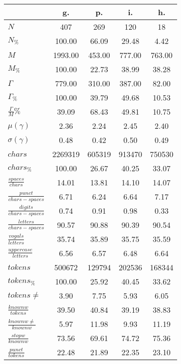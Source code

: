 \begin{table}[h!]
\begin{center}
\begin{tabular}{| l || c | c | c | c |}\hline
 & {\bf g.} & {\bf p.} & {\bf i.} & {\bf h.} \\\hline\hline
$N$ & 407  & 269  & 120  & 18 \\
$N_{\%}$ & 100.00  & 66.09  & 29.48  & 4.42 \\\hline
$M$ & 1993.00  & 453.00  & 777.00  & 763.00 \\
$M_{\%}$ & 100.00  & 22.73  & 38.99  & 38.28 \\\hline
$\Gamma$ & 779.00  & 310.00  & 387.00  & 82.00 \\
$\Gamma_{\%}$ & 100.00  & 39.79  & 49.68  & 10.53 \\\hline
$\frac{\Gamma}{M}\%$ & 39.09  & 68.43  & 49.81  & 10.75 \\
$\mu(\gamma)$ & 2.36  & 2.24  & 2.45  & 2.40 \\
$\sigma(\gamma)$ & 0.48  & 0.42  & 0.50  & 0.49 \\\hline\hline
$chars$ & 2269319  & 605319  & 913470  & 750530 \\
$chars_{\%}$ & 100.00  & 26.67  & 40.25  & 33.07 \\\hline
$\frac{spaces}{chars}$ & 14.01  & 13.81  & 14.10  & 14.07 \\
$\frac{punct}{chars-spaces}$ & 6.71  & 6.24  & 6.64  & 7.17 \\
$\frac{digits}{chars-spaces}$ & 0.74  & 0.91  & 0.98  & 0.33 \\\hline
$\frac{letters}{chars-spaces}$ & 90.57  & 90.88  & 90.39  & 90.54 \\
$\frac{vogals}{letters}$ & 35.74  & 35.89  & 35.75  & 35.59 \\
$\frac{uppercase}{letters}$ & 6.56  & 6.57  & 6.48  & 6.64 \\\hline\hline
$tokens$ & 500672  & 129794  & 202536  & 168344 \\
$tokens_{\%}$ & 100.00  & 25.92  & 40.45  & 33.62 \\
$tokens \neq$ & 3.90  & 7.75  & 5.93  & 6.05 \\\hline
$\frac{knownw}{tokens}$ & 39.50  & 40.84  & 39.19  & 38.83 \\
$\frac{knownw \neq}{knownw}$ & 5.97  & 11.98  & 9.93  & 11.19 \\\hline
$\frac{stopw}{knownw}$ & 73.56  & 69.61  & 74.72  & 75.36 \\
$\frac{punct}{tokens}$ & 22.48  & 21.89  & 22.35  & 23.10 \\

\end{tabular}
\end{center}
\end{table}
